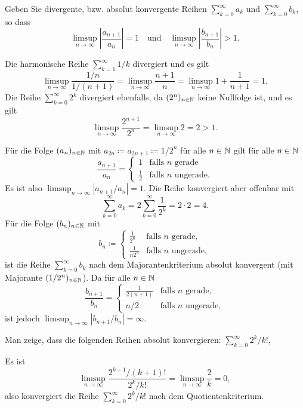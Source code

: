 \documentclass[a4paper,10pt]{article}
\begin{document}
\begin{question}
 Geben Sie divergente, bzw. absolut konvergente Reihen $\sum_{k=0}^\infty a_k$ und $\sum_{k=0}^\infty b_k$, so dass 
 \[
  \limsup_{n \to \infty} \left|\frac{a_{n+1}}{a_n}\right| = 1
  \quad
  \text{und}
  \quad
  \limsup_{n \to \infty} \left|\frac{b_{n+1}}{b_n}\right| > 1.
 \]
\end{question}
\begin{solution}
 Die harmonische Reihe $\sum_{k=1}^\infty 1/k$ divergiert und es gilt
 \[
  \limsup_{n \to \infty} \frac{1/n}{1/(n+1)}
  = \limsup_{n \to \infty} \frac{n+1}{n}
  = \limsup_{n \to \infty} 1+\frac{1}{n+1}
  = 1.
 \]
 Die Reihe $\sum_{k=0}^\infty 2^k$ divergiert ebenfalls, da $(2^n)_{n \in \mathbb{N}}$ keine Nullfolge ist, und es gilt
 \[
  \limsup_{n \to \infty} \frac{2^{n+1}}{2^n}
  = \limsup_{n \to \infty} 2
  = 2
  > 1.
 \]

 Für die Folge $(a_n)_{n \in \mathbb{N}}$ mit $a_{2n} \coloneqq a_{2n+1} \coloneqq 1/2^n$ für alle $n \in \mathbb{N}$ gilt für alle $n \in \mathbb{N}$
 \[
  \frac{a_{n+1}}{a_n} =
  \begin{cases}
            1  & \text{falls $n$ gerade} \\
   \frac{1}{2} & \text{falls $n$ ungerade}.
  \end{cases}
 \]
 Es ist also $\limsup_{n \to \infty} |a_{n+1}/a_n| = 1$. Die Reihe konvergiert aber offenbar mit
 \[
  \sum_{k=0}^\infty a_k
  = 2 \sum_{k=0}^\infty \frac{1}{2^k}
  = 2 \cdot 2
  = 4.
 \]
 Für die Folge $(b_n)_{n \in \mathbb{N}}$ mit
 \[
  b_n \coloneqq
  \begin{cases}
     \frac{1}{2^n} & \text{falls $n$ gerade}, \\
   \frac{1}{n 2^n} & \text{falls $n$ ungerade},
  \end{cases}
 \]
 ist die Reihe $\sum_{k=0}^\infty b_k$ nach dem Majorantenkriterium absolut konvergent (mit Majorante $(1/2^n)_{n \in \mathbb{N}}$). Da für alle $n \in \mathbb{N}$
 \[
  \frac{b_{n+1}}{b_n} =
  \begin{cases}
   \frac{1}{2(n+1)} & \text{falls $n$ gerade}, \\
                n/2 & \text{falls $n$ ungerade},
  \end{cases}
 \]
 ist jedoch $\limsup_{n \to \infty} |b_{n+1}/b_n| = \infty$.
\end{solution}

\begin{question}
 Man zeige, dass die folgenden Reihen absolut konvergieren: $\sum_{k=0}^\infty 2^k/k!$,
\end{question}
\begin{solution}
 Es ist
 \[
  \limsup_{n \to \infty} \frac{2^{k+1} / (k+1)!}{2^k / k!}
  = \limsup_{n \to \infty}\frac{2}{k} = 0,
 \]
 also konvergiert die Reihe $\sum_{k=0}^\infty 2^k/k!$ nach dem Quotientenkriterium.
\end{solution}
\end{document}
